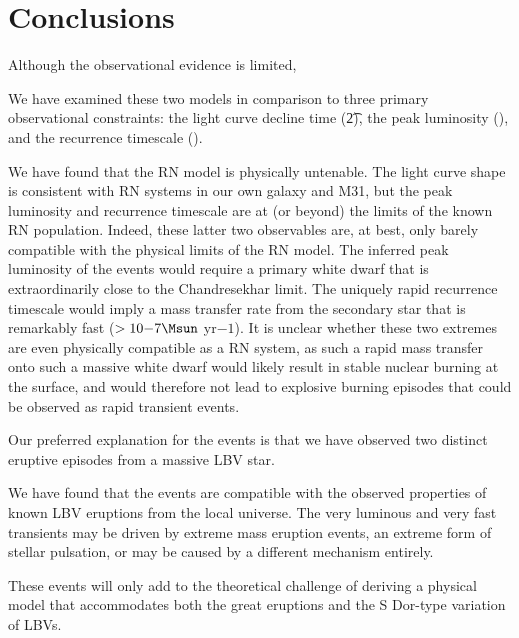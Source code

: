 \section{Conclusions}
\label{sec:Conclusions}

Although the observational evidence is limited,


We have examined these two models in comparison to three primary
observational constraints: the light curve decline time (\t2), the
peak luminosity (\Lpk), and the recurrence timescale (\trec).

We have found that the RN model is physically untenable. The light
curve shape is consistent with RN systems in our own galaxy and M31,
but the peak luminosity and recurrence timescale are at (or beyond)
the limits of the known RN population.  Indeed, these latter two
observables are, at best, only barely compatible with the physical
limits of the RN model. The inferred peak luminosity of the \spock
events would require a primary white dwarf that is extraordinarily
close to the Chandresekhar limit.  The uniquely rapid recurrence
timescale would imply a mass transfer rate from the secondary star
that is remarkably fast ($>10{-7} \Msun$ yr${-1}$).  It is unclear
whether these two extremes are even physically compatible as a RN
system, as such a rapid mass transfer onto such a massive white dwarf
would likely result in stable nuclear burning at the surface, and
would therefore not lead to explosive burning episodes that could be
observed as rapid transient events.

Our preferred explanation for the \spock events is that we have
observed two distinct eruptive episodes from a massive LBV star. 

We have found that the \spock events are compatible with the observed
properties of known LBV eruptions from the local universe.
The very luminous and very fast \spock
transients may be driven by extreme mass eruption events, an extreme
form of stellar pulsation, or may be caused by a different mechanism
entirely.

These events will only add to the theoretical challenge of deriving a
physical model that accommodates both the great eruptions and the S
Dor-type variation of LBVs.



